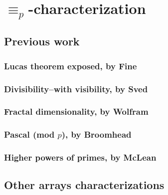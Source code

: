
\chapter{$\equiv_{p}$-characterization}

\section{Previous work}
\subsection{Lucas theorem exposed, by Fine}
\subsection{Divisibility--with visibility, by Sved}
\subsection{Fractal dimensionality, by Wolfram}
\subsection{Pascal (mod $p$), by Broomhead}
\subsection{Higher powers of primes, by McLean}




\section{Other arrays characterizations}
